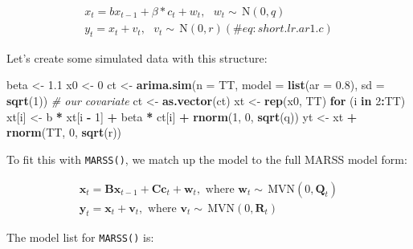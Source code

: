 \documentclass[12pt,]{book}
\newenvironment{Shaded}{\begin{snugshade}}{\end{snugshade}}
\newcommand{\CommentTok}[1]{\textcolor[rgb]{0.56,0.35,0.01}{\textit{#1}}}
\newcommand{\ControlFlowTok}[1]{\textcolor[rgb]{0.13,0.29,0.53}{\textbf{#1}}}
\newcommand{\DataTypeTok}[1]{\textcolor[rgb]{0.13,0.29,0.53}{#1}}
\newcommand{\DecValTok}[1]{\textcolor[rgb]{0.00,0.00,0.81}{#1}}
\newcommand{\FloatTok}[1]{\textcolor[rgb]{0.00,0.00,0.81}{#1}}
\newcommand{\KeywordTok}[1]{\textcolor[rgb]{0.13,0.29,0.53}{\textbf{#1}}}
\newcommand{\NormalTok}[1]{#1}
\newcommand{\OperatorTok}[1]{\textcolor[rgb]{0.81,0.36,0.00}{\textbf{#1}}}
\newcommand{\StringTok}[1]{\textcolor[rgb]{0.31,0.60,0.02}{#1}}
\begin{document}
\begin{gather}
x_{t} = bx_{t-1} + \beta*c_t + w_{t}, \text{ } w_t \sim \,\text{N}(0,q)  \\
y_{t} = x_{t} + v_t, \text{ } v_t \sim \,\text{N}(0,r)  
(\#eq:short.lr.ar1.c)
\end{gather}

Let's create some simulated data with this structure:

\begin{Shaded}
\begin{Highlighting}[]
\NormalTok{beta <-}\StringTok{ }\FloatTok{1.1}
\NormalTok{x0 <-}\StringTok{ }\DecValTok{0}
\NormalTok{ct <-}\StringTok{ }\KeywordTok{arima.sim}\NormalTok{(}\DataTypeTok{n =}\NormalTok{ TT, }\DataTypeTok{model =} \KeywordTok{list}\NormalTok{(}\DataTypeTok{ar =} \FloatTok{0.8}\NormalTok{), }\DataTypeTok{sd =} \KeywordTok{sqrt}\NormalTok{(}\DecValTok{1}\NormalTok{))  }\CommentTok{# our covariate}
\NormalTok{ct <-}\StringTok{ }\KeywordTok{as.vector}\NormalTok{(ct)}
\NormalTok{xt <-}\StringTok{ }\KeywordTok{rep}\NormalTok{(x0, TT)}
\ControlFlowTok{for}\NormalTok{ (i }\ControlFlowTok{in} \DecValTok{2}\OperatorTok{:}\NormalTok{TT) xt[i] <-}\StringTok{ }\NormalTok{b }\OperatorTok{*}\StringTok{ }\NormalTok{xt[i }\OperatorTok{-}\StringTok{ }\DecValTok{1}\NormalTok{] }\OperatorTok{+}\StringTok{ }\NormalTok{beta }\OperatorTok{*}\StringTok{ }\NormalTok{ct[i] }\OperatorTok{+}\StringTok{ }\KeywordTok{rnorm}\NormalTok{(}\DecValTok{1}\NormalTok{, }
    \DecValTok{0}\NormalTok{, }\KeywordTok{sqrt}\NormalTok{(q))}
\NormalTok{yt <-}\StringTok{ }\NormalTok{xt }\OperatorTok{+}\StringTok{ }\KeywordTok{rnorm}\NormalTok{(TT, }\DecValTok{0}\NormalTok{, }\KeywordTok{sqrt}\NormalTok{(r))}
\end{Highlighting}
\end{Shaded}

To fit this with \texttt{MARSS()}, we match up the model to the full MARSS model form:

\begin{equation}
\begin{gather}
\mathbf{x}_t = \mathbf{B}\mathbf{x}_{t-1} + \mathbf{C}\mathbf{c}_t + \mathbf{w}_t, \text{ where } \mathbf{w}_t \sim \,\text{MVN}(0,\mathbf{Q}_t)\\
\mathbf{y}_t = \mathbf{x}_t + \mathbf{v}_t, \text{ where } \mathbf{v}_t \sim \,\text{MVN}(0,\mathbf{R}_t)
\end{gather}
\end{equation}

The model list for \texttt{MARSS()} is:
\end{document}

